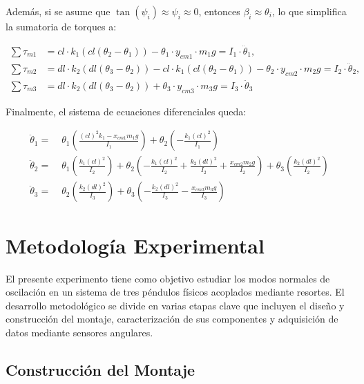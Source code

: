 Además, si se asume que \(\tan(\psi_i) \approx \psi_i \approx 0\), entonces \(\beta_i \approx \theta_i\), lo que simplifica la sumatoria de torques a:

\begin{align*}
\sum \tau_{m1} &= cl \cdot k_1 (cl(\theta_2 - \theta_1)) - \theta_1 \cdot y_{cm1} \cdot m_1 g = I_1 \cdot \ddot{\theta}_1, \\
\sum \tau_{m2} &= dl \cdot k_2 (dl(\theta_3 - \theta_2)) - cl \cdot k_1 (cl(\theta_2 - \theta_1)) - \theta_2 \cdot y_{cm2} \cdot m_2 g = I_2 \cdot \ddot{\theta}_2, \\
\sum \tau_{m3} &= dl \cdot k_2 (dl(\theta_3 - \theta_2)) + \theta_3 \cdot y_{cm3} \cdot m_3 g = I_3 \cdot \ddot{\theta}_3
\end{align*}

Finalmente, el sistema de ecuaciones diferenciales queda:

\begin{equation}
\begin{aligned}
\ddot{\theta}_1 =\; & \theta_1 \left( \frac{(cl)^2 k_{1} - x_{cm1} m_1 g}{I_1} \right) + \theta_2 \left( -\frac{k_1 (cl)^2}{I_1} \right) \\
\ddot{\theta}_2 =\; & \theta_1 \left( \frac{k_1 (cl)^2}{I_2} \right) + \theta_2 \left( -\frac{k_1 (cl)^2}{I_2} + \frac{k_2 (dl)^2}{I_2} + \frac{x_{cm2} m_2 g}{I_2} \right) + \theta_3 \left( \frac{k_2 (dl)^2}{I_2} \right) \\
\ddot{\theta}_3 =\; & \theta_2 \left( \frac{k_2 (dl)^2}{I_3} \right) + \theta_3 \left( -\frac{k_2 (dl)^2}{I_3} - \frac{x_{cm3} m_3 g}{I_3} \right)
\end{aligned}
\end{equation}

\section{Metodología Experimental}

El presente experimento tiene como objetivo estudiar los modos normales de oscilación en un sistema de tres péndulos físicos acoplados mediante resortes. El desarrollo metodológico se divide en varias etapas clave que incluyen el diseño y construcción del montaje, caracterización de sus componentes y adquisición de datos mediante sensores angulares.

\subsection{Construcción del Montaje}

